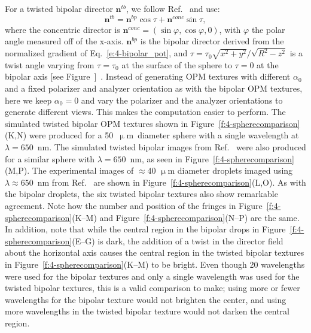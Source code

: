 For a twisted bipolar director $\mathbf{n}^{tb}$, we follow Ref.~\cite{RN177} and use:
\begin{equation}
\mathbf{n}^{tb} = \mathbf{n}^{bp}\cos\tau +\mathbf{n}^{conc}\sin\tau,
\end{equation}
where the concentric director is $\mathbf{n}^{conc} = (\sin \varphi,\cos \varphi,0)$, with $\varphi$ the polar angle measured off of the x-axis.
$\mathbf{n}^{bp}$ is the bipolar director derived from the normalized gradient of Eq.~\ref{e:4-bipolar_pot}, and $\tau = \tau_0\sqrt{x^2+y^2}/\sqrt{R^2-z^2}$ is a twist angle varying from $\tau=\tau_0$ at the surface of the sphere to $\tau=0$ at the bipolar axis [see Figure~]~\cite{RN177}.
Instead of generating OPM textures with different $\alpha_0$ and a fixed polarizer and analyzer orientation as with the bipolar OPM textures, here we keep $\alpha_0=0$ and vary the polarizer and the analyzer orientations to generate different views.
This makes the computation easier to perform.
The simulated twisted bipolar OPM textures shown in Figure~\ref{f:4-spherecomparison}(K,N) were produced for a 50~$\upmu$m~diameter sphere with a single wavelength at $\lambda = 650$~nm.
The simulated twisted bipolar images from Ref.~\cite{RN193} were also produced for a similar sphere with $\lambda = 650$~nm, as seen in Figure~\ref{f:4-spherecomparison}(M,P).
The experimental images of $\approx 40$ $\upmu$m diameter droplets imaged using $\lambda \approx 650$~nm from Ref.~\cite{RN193} are shown in Figure~\ref{f:4-spherecomparison}(L,O).
As with the bipolar droplets, the six twisted bipolar textures also show remarkable agreement.
Note how the number and position of the fringes in Figure~\ref{f:4-spherecomparison}(K--M) and Figure~\ref{f:4-spherecomparison}(N--P) are the same.
In addition, note that while the central region in the bipolar drops in Figure~\ref{f:4-spherecomparison}(E--G) is dark, the addition of a twist in the director field about the horizontal axis causes the central region in the twisted bipolar textures in Figure~\ref{f:4-spherecomparison}(K--M) to be bright.
Even though 20 wavelengths were used for the bipolar textures and only a single wavelength was used for the twisted bipolar textures, this is a valid comparison to make; using more or fewer wavelengths for the bipolar texture would not brighten the center, and using more wavelengths in the twisted bipolar texture would not darken the central region.


